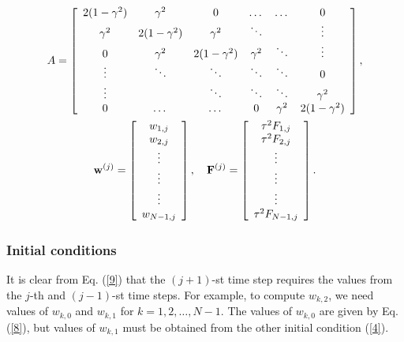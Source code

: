 \begin{gather}
A=\left[
\begin{array}{cccccc}
2(1-\gamma^{2}) &\gamma^{2} &0      &\dots  &\dots &0 \\
\gamma^{2} &2(1-\gamma^{2}) &\gamma^{2} &\ddots  &     &\vdots \\
0      &\gamma^{2} &2(1-\gamma^{2}) &\gamma^{2} &\ddots &\vdots \\
\vdots &\ddots &\ddots &\ddots &\ddots &0 \\
\vdots &       &\ddots &\ddots &\ddots &\gamma^{2} \\
0      &\dots  &\dots  &0      &\gamma^{2} &2(1-\gamma^{2})
\end{array}\right], \\
{\bf w}^{(j)}=\left[
\begin{array}{c}
w_{1,j} \\
w_{2,j} \\
\vdots \\
\vdots \\
\vdots \\
w_{N-1,j}
\end{array}\right], \quad
{\bf F}^{(j)}=\left[
\begin{array}{c}
\tau^2 F_{1,j} \\
\tau^2 F_{2,j} \\
\vdots \\
\vdots \\
\vdots \\
\tau^2 F_{N-1,j}
\end{array}\right].
\label{77}
\end{gather}


\subsubsection{Initial conditions}
It is clear from Eq. (\ref{9}) that the $(j+1)$-st time step
requires the values from the $j$-th and $(j-1)$-st time steps. For
example, to compute $w_{k,2}$, we need values of $w_{k,0}$ and
$w_{k,1}$ for $k=1, 2, \dots, N-1$. The values of $w_{k,0}$ are
given by Eq. (\ref{8}), but values of $w_{k,1}$ must be obtained
from the other initial condition (\ref{4}).

